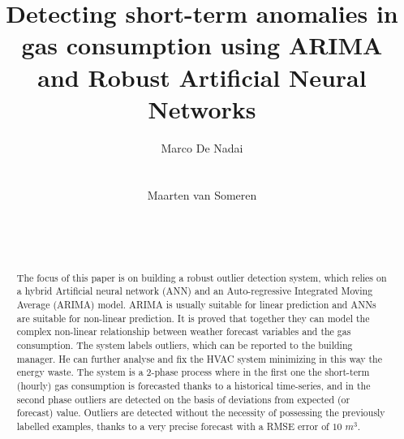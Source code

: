 \documentclass{sig-alternate-sigmod07}
\begin{document}
%
\makeatletter
\def\@copyrightspace{\relax}
\makeatother
\title{Detecting short-term anomalies in gas consumption using ARIMA and Robust Artificial Neural Networks}
%
%
\author{
%
%
\alignauthor
Marco De Nadai\\
       \\
      \\
\alignauthor
Maarten van Someren\\ 
       \\
       \\
       \\
}
\maketitle
\begin{abstract}

The focus of this paper is on building a robust outlier detection system, which relies on a hybrid Artificial neural network (ANN) and an Auto-regressive Integrated Moving Average (ARIMA) model. ARIMA is usually suitable for linear prediction and ANNs are suitable for non-linear prediction. It is proved that together they can model the complex non-linear relationship between weather forecast variables and the gas consumption. The system labels outliers, which can be reported to the building manager. He can further analyse and fix the HVAC system minimizing in this way the energy waste. 
The system is a 2-phase process where in the first one the short-term (hourly) gas consumption is forecasted thanks to a historical time-series, and in the second phase outliers are detected on the basis of deviations from expected (or forecast) value. 
Outliers are detected without the necessity of possessing the previously labelled examples, thanks to a very precise forecast with a RMSE error of $10$ $m^3$.

\end{abstract}
\end{document}
